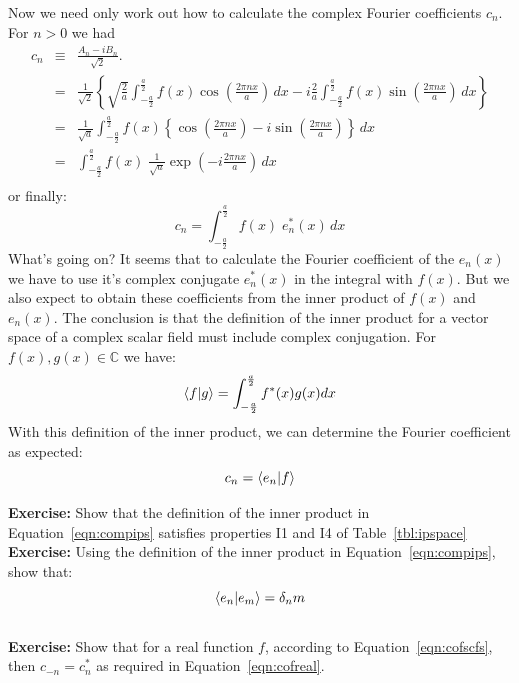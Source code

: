 \documentclass[12pt]{book}
\begin{document}
Now we need only work out how to calculate the complex Fourier coefficients $c_n$. For $n>0$ we had
\begin{eqnarray*}
c_n &\equiv& \frac{A_n - i B_n}{\sqrt{2}}. \\
&=& \frac{1}{\sqrt{2}} \left\{ 
\sqrt{\frac{2}{a}} \int_{-\frac{a}{2}}^{\frac{a}{2}}  f(x) \cos\left( \frac{2\pi n x}{a}\right) \, dx
-i \frac{2}{a} \int_{-\frac{a}{2}}^{\frac{a}{2}}  f(x) \sin\left(\frac{2\pi n x}{a}\right) \, dx
\right\} \\
&=& \frac{1}{\sqrt{a}} \int_{-\frac{a}{2}}^{\frac{a}{2}}  f(x) \left\{\cos\left( \frac{2\pi n x}{a}\right) - i \sin\left( \frac{2\pi n x}{a}\right)\right\} \, dx \\
 &=& \int_{-\frac{a}{2}}^{\frac{a}{2}}  f(x) \; \frac{1}{\sqrt{a}}\exp\left(-i \frac{2\pi n x}{a}\right) \, dx \\
\end{eqnarray*}
or finally:
\begin{equation*}
c_n = \int_{-\frac{a}{2}}^{\frac{a}{2}}  f(x) \; e_n^*(x) \, dx 
\end{equation*}
What's going on?  It seems that to calculate the Fourier coefficient of the $e_n(x)$ we have to use it's complex conjugate $e_n^*(x)$ in the integral with $f(x)$. But we also expect to obtain these coefficients from the inner product of $f(x)$ and $e_n(x)$.  The conclusion is that the definition of the inner product for a vector space of a complex scalar field must include complex conjugation.  For $f(x), g(x) \in \mathbb{C}$ we have:
\begin{equation}
\label{eqn:compips}
\braket{f|g} = \int_{-\frac{a}{2}}^{\frac{a}{2}} f^*(x) g(x) dx
\end{equation}
With this definition of the inner product, we can determine the Fourier coefficient as expected:
\begin{equation}
\label{eqn:cofscfs}
c_n = \braket{e_n|f}
\end{equation}

\noindent
{\bf Exercise:} Show that the definition of the inner product in Equation~\ref{eqn:compips} satisfies properties I1 and I4 of Table~\ref{tbl:ipspace}\\

\noindent
{\bf Exercise:} Using the definition of the inner product in Equation~\ref{eqn:compips}, show that:
$$\braket{e_n|e_m} = \delta_nm$$\\

\noindent
{\bf Exercise:} Show that for a real function $f$, according to Equation~\ref{eqn:cofscfs}, then
$c_{-n} = c_{n}^*$ as required in Equation~\ref{eqn:cofreal}.\\  
\end{document}
